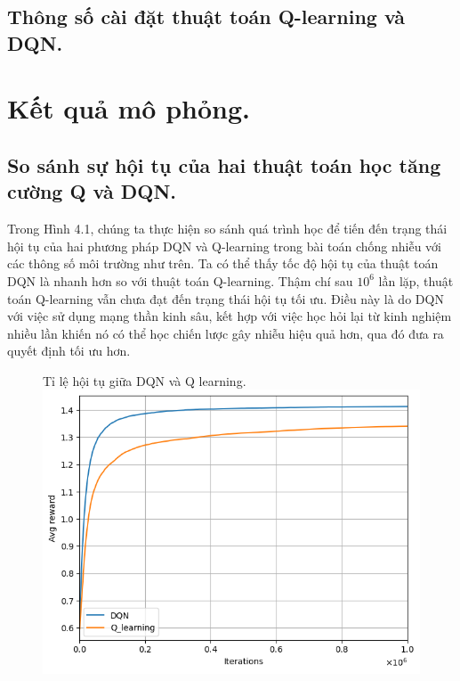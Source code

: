\documentclass{uetgraduation}
\begin{document}
\subsection{Thông số cài đặt thuật toán Q-learning và DQN.}


\section{Kết quả mô phỏng.}
\subsection{So sánh sự hội tụ của hai thuật toán học tăng cường Q và DQN.}
Trong Hình 4.1, chúng ta thực hiện so sánh quá trình học để tiến đến trạng thái hội tụ của hai phương pháp DQN và Q-learning trong bài toán
chống nhiễu với các thông số môi trường như trên. Ta có thể thấy tốc độ hội tụ của thuật toán DQN là nhanh hơn so với thuật toán Q-learning.
Thậm chí sau $10^6$ lần lặp, thuật toán Q-learning vẫn chưa đạt đến trạng thái hội tụ tối ưu. Điều này là do DQN với việc sử dụng mạng thần
kinh sâu, kết hợp với việc học hỏi lại từ kinh nghiệm nhiều lần khiến nó có thể học chiến lược gây nhiễu hiệu quả hơn, qua đó đưa ra quyết định
tối ưu hơn.

\begin{figure}{Tỉ lệ hội tụ giữa DQN và Q learning.}
    \centering
    \includegraphics[scale=0.5]{converged}
    \label{fig:converged}
\end{figure}
\end{document}
